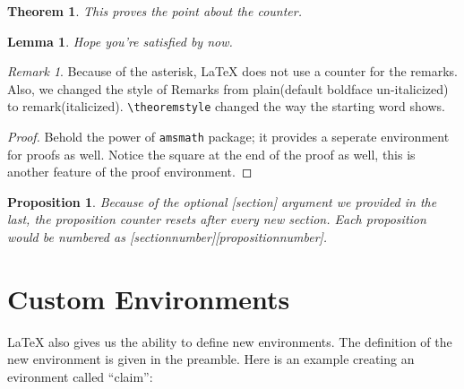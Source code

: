 \documentclass{article}
\newcounter{claim} %
\newtheorem{theorem}{Theorem}
\newtheorem{lemma}{Lemma}
\newtheorem{proposition}{Proposition}[section]
\theoremstyle{remark}
\newtheorem*{remark}{Remark}
\begin{document}
    \begin{theorem}
        This proves the point about the counter.
    \end{theorem}

    \begin{lemma}
        Hope you're satisfied by now.
    \end{lemma}

    \begin{remark}
        Because of the asterisk, \LaTeX{} does not use a counter for the remarks. Also, we changed the
        style of Remarks from plain(default boldface un-italicized) to remark(italicized).
        \verb!\theoremstyle! changed the way the starting word shows.
    \end{remark}

    \begin{proof}
        Behold the power of \verb!amsmath! package; it provides a seperate environment for proofs as well. Notice
        the square at the end of the proof as well, this is another feature of the proof environment.\footnotemark[3]
    \end{proof}

    \begin{proposition}
        Because of the optional [section] argument we provided in the last, the proposition counter
        resets after every new section. Each proposition would be numbered as [sectionnumber][propositionnumber].
    \end{proposition}

\clearpage
\section{Custom Environments}

\LaTeX{} also gives us the ability to define new environments. The definition of the new environment
is given in the preamble. Here is an example creating an evironment called ``claim'':
\end{document}
